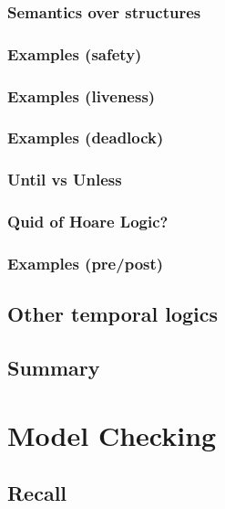 \documentclass[12pt, a4paper]{book}
\begin{document}
  \subsubsection{Semantics over structures}
  \label{subs:Semantics over structures}
  \subsubsection{Examples (safety)}
  \label{subs:Examples (safety)}
  \subsubsection{Examples (liveness)}
  \label{subs:Examples (liveness)}
  \subsubsection{Examples (deadlock)}
  \label{subs:Examples (deadlock)}
  \subsubsection{Until vs Unless}
  \label{subs:Until vs Unless}
  \subsubsection{Quid of Hoare Logic?}
  \label{subs:Quid of Hoare Logic?}
  \subsubsection{Examples (pre/post)}
  \label{subs:Examples (pre/post)}
  \subsection{Other temporal logics}
  \label{sub:Other temporal logics}
  \subsection{Summary}
  \label{sub:Summary}






  \section{Model Checking}
  \label{sec:Model Checking}
  \subsection{Recall}
  \label{sub:Recall}
\end{document}
